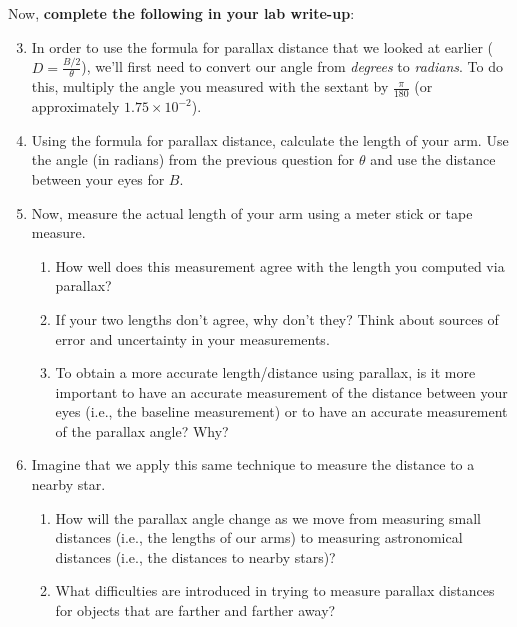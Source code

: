 \documentclass[11pt]{article}
\begin{document}
\medskip \noindent
Now, \textbf{complete the following in your lab write-up}:
\begin{enumerate}
\setcounter{enumi}{2}
    \item In order to use the formula for parallax distance that we looked at earlier ($D = \frac{B/2}{\theta}$), we'll first need to convert our angle from \emph{degrees} to \emph{radians}. To do this, multiply the angle you measured with the sextant by $\frac{\pi}{180}$ (or approximately $1.75 \times 10^{-2}$).
    
    \item Using the formula for parallax distance, calculate the length of your arm. Use the angle (in radians) from the previous question for $\theta$ and use the distance between your eyes for $B$.
    
    \item Now, measure the actual length of your arm using a meter stick or tape measure.
    \begin{enumerate}
        \item How well does this measurement agree with the length you computed via parallax?
        
        \item If your two lengths don't agree, why don't they? Think about sources of error and uncertainty in your measurements.
        
        \item To obtain a more accurate length/distance using parallax, is it more important to have an accurate measurement of the distance between your eyes (i.e., the baseline measurement) or to have an accurate measurement of the parallax angle? Why?
    \end{enumerate}
    
    \item Imagine that we apply this same technique to measure the distance to a nearby star.
    \begin{enumerate}
        \item How will the parallax angle change as we move from measuring small distances (i.e., the lengths of our arms) to measuring astronomical distances (i.e., the distances to nearby stars)?
        
        \item What difficulties are introduced in trying to measure parallax distances for objects that are farther and farther away? 
    \end{enumerate}
        
\end{enumerate}
\end{document}
